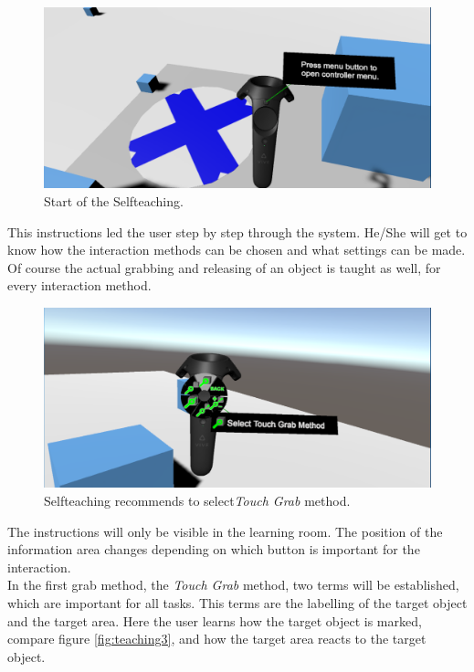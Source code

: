 \begin{figure}[H] 
	\center 
	\includegraphics[width=12cm]{Images/teaching.PNG}
	\caption[Start of the Selfteaching.]{Start of the Selfteaching.}
	\label{fig:teaching1}
\end{figure}

This instructions led the user step by step through the system. He/She will get to know how the interaction methods can be chosen and what settings can be made. Of course the actual grabbing and releasing of an object is taught as well, for every interaction method. 

\begin{figure}[H] 
	\center 
	\includegraphics[width=12cm]{Images/teaching2.PNG}
	\caption[Selfteaching recommends to select \textit{Touch Grab} method.]{Selfteaching recommends to select\textit{Touch Grab} method.}
	\label{fig:teaching2}
\end{figure}

The instructions will only be visible in the learning room. The position of the information area changes depending on which button is important for the interaction. \\
In the first grab method, the \textit{Touch Grab} method, two terms will be established, which are important for all tasks. This terms are the labelling of the target object and the target area. Here the user learns how the target object is marked, compare figure \ref{fig:teaching3}, and how the target area reacts to the target object.

